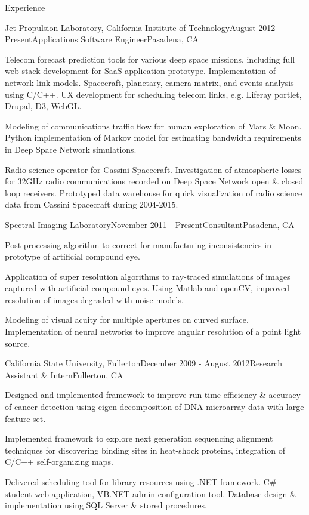 \documentclass{resume} %
\begin{document}
\begin{rSection}{Experience}
\begin{rSubsection}{Jet Propulsion Laboratory, California Institute of Technology}{August 2012 - Present}{Applications Software Engineer}{Pasadena, CA}
\item Telecom forecast prediction tools for various deep space missions, including full web stack development for SaaS application prototype. Implementation of network link models. Spacecraft, planetary, camera-matrix, and events analysis using C/C++. UX development for scheduling telecom links, e.g. Liferay portlet, Drupal, D3, WebGL. 
\item Modeling of communications traffic flow for human exploration of Mars \& Moon. Python implementation of Markov model for estimating bandwidth requirements in Deep Space Network simulations. 
\item Radio science operator for Cassini Spacecraft. Investigation of atmospheric losses for 32GHz radio communications recorded on Deep Space Network open \& closed loop receivers. Prototyped data warehouse for quick visualization of radio science data from Cassini Spacecraft during 2004-2015. 
\end{rSubsection}


\begin{rSubsection}{Spectral Imaging Laboratory}{November 2011 - Present}{Consultant}{Pasadena, CA}
\item Post-processing algorithm to correct for manufacturing inconsistencies in prototype of artificial compound eye.
\item Application of super resolution algorithms to ray-traced simulations of images captured with artificial compound eyes. Using Matlab and openCV, improved resolution of images degraded with noise models.
\item Modeling of visual acuity for multiple apertures on curved surface. Implementation of neural networks to improve angular resolution of a point light source. 
\end{rSubsection}




\begin{rSubsection}{California State University, Fullerton}{December 2009 - August 2012}{Research Assistant \& Intern}{Fullerton, CA}
\item Designed and implemented framework to improve run-time efficiency \& accuracy of cancer detection using eigen decomposition of DNA microarray data with large feature set.
\item Implemented framework to explore next generation sequencing alignment techniques for discovering binding sites in heat-shock proteins, integration of C/C++ self-organizing maps.
\item Delivered scheduling tool for library resources using .NET framework. C\# student web application, VB.NET admin configuration tool. Database design \& implementation using SQL Server \& stored procedures.
\end{rSubsection}
\end{rSection}
\end{document}
